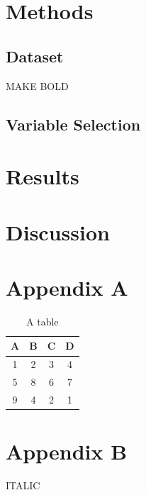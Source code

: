 \documentclass{stats_apa}
\begin{document}
\section*{Methods}

\subsection*{Dataset} 

MAKE BOLD

\subsection*{Variable Selection}

\section*{Results}

\section*{Discussion}

\newpage




\newpage
\appendix

\section*{Appendix A}
\label{app: A}

\begin{table}[H]
\caption{A table}
\begin{tabular}{|c|c|c|c|}
\hline 
A & B & C & D \\ 
\hline 
1 & 2 & 3 & 4 \\ 
\hline 
5 & 8 & 6 & 7 \\ 
\hline 
9 & 4 & 2 & 1 \\ 
\hline 
\end{tabular} 
\label{table: test}
\end{table}


\newpage

\section*{Appendix B}
\label{app: B}

ITALIC
\end{document}
